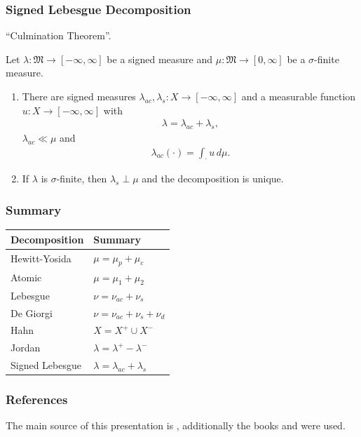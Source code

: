 \documentclass[10pt, hyperref={hidelinks}]{beamer}
\begin{document}
    \begin{frame}
        \frametitle{Signed Lebesgue Decomposition}

        \enquote{Culmination Theorem}.

        \begin{theorem}
            Let \(\lambda\colon \mathfrak{M} \to [-\infty, \infty]\) be a signed measure and \(\mu\colon \mathfrak{M} \to [0, \infty]\) be a \(\sigma\)-finite measure.
            \begin{enumerate}[label=(\roman*), wide]
                \item \label{thm:lebesgue_decomposition_thm_1} There are signed measures \(\lambda_{ac}, \lambda_s\colon X \to [-\infty, \infty]\) and a measurable function \(u\colon X \to [-\infty, \infty]\) with
                \begin{align}
                    \lambda = \lambda_{ac} + \lambda_s,
                \end{align}
                \(\lambda_{ac} \ll \mu\) and
                \begin{align}
                    \lambda_{ac}(\cdot) = \int_{\cdot} u \, d\mu.
                \end{align}
                \item \label{thm:lebesgue_decomposition_thm_2} If \(\lambda\) is \(\sigma\)-finite, then \(\lambda_s \perp \mu\) and the decomposition is unique.
            \end{enumerate}
        \end{theorem}
    \end{frame}

    \begin{frame}
        \frametitle{Summary}

        \begin{minipage}{\linewidth}
            \centering
            \begin{tabular}{C{4cm}|C{3cm}}
                Decomposition & Summary \\\hline
                Hewitt-Yosida \cite[pp. 8-9]{Fonseca} & \(\mu = \mu_p + \mu_c\)\\
                Atomic \cite[pp. 13-16]{Fonseca} & \(\mu = \mu_1 + \mu_2\)\\
                Lebesgue & \(\nu = \nu_{ac} + \nu_s\)\\
                De Giorgi & \(\nu = \nu_{ac} + \nu_s + \nu_d\)\\
                Hahn & \(X = X^+ \cup X^-\)\\
                Jordan & \(\lambda = \lambda^+ - \lambda^-\)\\
                Signed Lebesgue & \(\lambda = \lambda_{ac} + \lambda_s\)
            \end{tabular}
        \end{minipage}
    \end{frame}

    \begin{frame}
        \frametitle{References}

        The main source of this presentation is \cite{Fonseca}, additionally the books \cite{Axler} and \cite{Elstrodt} were used.

        \printbibliography{}
    \end{frame}
\end{document}
